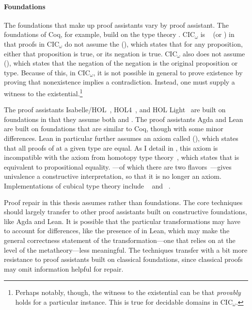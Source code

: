 \paragraph{Foundations}
The foundations that make up proof assistants vary by proof assistant.
The foundations of Coq, for example, build on the  type theory .
CIC$_{\omega}$ is ~\cite{Heyting1956} (or ) in that
proofs in CIC$_{\omega}$ do not assume the  (),
which states that for any proposition, either that proposition is true, or its negation is true.
CIC$_{\omega}$ also does not assume  (),
which states that the negation of the negation is the original proposition or type.
Because of this, in CIC$_{\omega}$, it is not possible in general to prove existence by proving that 
nonexistence implies a contradiction.
Instead, one must supply a witness to the existential.\footnote{Perhaps notably, though, the witness to the existential can be that 
 \emph{provably} holds for a particular instance. This is true for decidable domains in CIC$_{\omega}$.} 

The proof assistants Isabelle/HOL~\cite{isabelle}, HOL4~\cite{hol4-interact}, and HOL Light~\cite{hollight} are built on  foundations
in that they assume both  and .
The proof assistants Agda and Lean are built on  foundations that are similar to Coq, though with some minor differences.
Lean in particular further assumes an axiom called  (), which states that all proofs of
 at a given type are equal.
As I detail in , this axiom is incompatible with the  axiom from homotopy type theory~\cite{univalent2013homotopy},
which states that  is equivalent to propositional equality.
---of which there are two flavors~\cite{cohen2016cubical, angiuli2017cubical}---gives univalence a constructive interpretation,
so that it is no longer an axiom.
Implementations of cubical type theory include ~\cite{redprl} and ~\cite{cubical-agda}.

Proof repair in this thesis assumes  rather than  foundations.
The core techniques should largely transfer to other proof assistants built on constructive foundations, like Agda and Lean.
It is possible that the particular transformations may have to account for differences, like the presence of  in Lean,
which may make the general correctness statement of the \toolnamec transformation---one that relies on  at the level of the metatheory---less meaningful.
The techniques transfer with a bit more resistance to proof assistants built on classical foundations,
since classical proofs may omit information helpful for repair.

